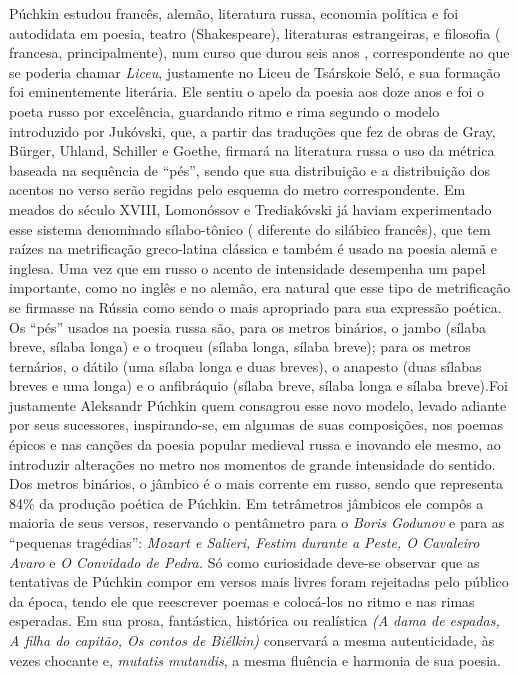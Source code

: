 Púchkin estudou francês, alemão, literatura russa, economia política e
foi autodidata em poesia, teatro (Shakespeare), literaturas
estrangeiras, e filosofia ( francesa, principalmente), num curso que
durou seis anos , correspondente ao que se poderia chamar \emph{Liceu},
justamente no Liceu de Tsárskoie Seló, e sua formação foi eminentemente
literária. Ele sentiu o apelo da poesia aos doze anos e foi o poeta
russo por excelência, guardando ritmo e rima segundo o modelo
introduzido por Jukóvski, que, a partir das traduções que fez de obras
de Gray, Bürger, Uhland, Schiller e Goethe, firmará na literatura russa
o uso da métrica baseada na sequência de ``pés'', sendo que sua
distribuição e a distribuição dos acentos no verso serão regidas pelo
esquema do metro correspondente. Em meados do século XVIII, Lomonóssov e
Trediakóvski já haviam experimentado esse sistema denominado
sílabo-tônico ( diferente do silábico francês), que tem raízes na
metrificação greco-latina clássica e também é usado na poesia alemã e
inglesa. Uma vez que em russo o acento de intensidade desempenha um
papel importante, como no inglês e no alemão, era natural que esse tipo
de metrificação se firmasse na Rússia como sendo o mais apropriado para
sua expressão poética. Os ``pés'' usados na poesia russa são, para os
metros binários, o jambo (sílaba breve, sílaba longa) e o troqueu
(sílaba longa, sílaba breve); para os metros ternários, o dátilo (uma
sílaba longa e duas breves), o anapesto (duas sílabas breves e uma
longa) e o anfibráquio (sílaba breve, sílaba longa e sílaba breve).Foi
justamente Aleksandr Púchkin quem consagrou esse novo modelo, levado
adiante por seus sucessores, inspirando-se, em algumas de suas
composições, nos poemas épicos e nas canções da poesia popular medieval
russa e inovando ele mesmo, ao introduzir alterações no metro nos
momentos de grande intensidade do sentido. Dos metros binários, o
jâmbico é o mais corrente em russo, sendo que representa 84\% da
produção poética de Púchkin. Em tetrâmetros jâmbicos ele compôs a
maioria de seus versos, reservando o pentâmetro para o \emph{Boris
Godunov} e para as ``pequenas tragédias'': \emph{Mozart e Salieri,
Festim durante a Peste, O Cavaleiro Avaro} e \emph{O Convidado de
Pedra.} Só como curiosidade deve-se observar que as tentativas de
Púchkin compor em versos mais livres foram rejeitadas pelo público da
época, tendo ele que reescrever poemas e colocá-los no ritmo e nas rimas
esperadas. Em sua prosa, fantástica, histórica ou realística \emph{(A
dama de espadas, A filha do capitão, Os contos de Biélkin)} conservará a
mesma autenticidade, às vezes chocante e, \emph{mutatis mutandis}, a
mesma fluência e harmonia de sua poesia.

